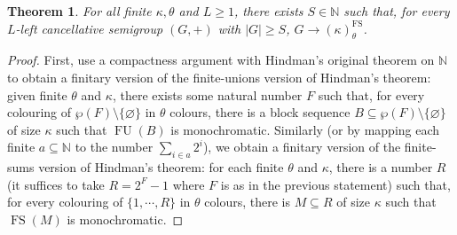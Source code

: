 \documentclass{amsart}
\newtheorem{theorem}{Theorem}[section]
\theoremstyle{definition}
\theoremstyle{remark}
\numberwithin{equation}{section}
\begin{document}
\begin{theorem}\label{fin-fin-hindman}
    For all finite $\kappa,\theta$ and $L\geq 1$, there exists $S\in\mathbb{N}$ such that, for every $L$-left cancellative semigroup $(G,+)$ with $|G|\geq S$, $G\to (\kappa)_{\theta}^{\operatorname{FS}}$.
\end{theorem}
\begin{proof}
    First, use a compactness argument with Hindman's original theorem on $\mathbb N$ to obtain a finitary version of the finite-unions version of Hindman's theorem: given finite $\theta$ and $\kappa$, there exists some natural number $F$ such that, for every colouring of $\wp(F)\setminus\{\varnothing\}$ in $\theta$ colours, there is a block sequence $B\subseteq\wp(F)\setminus\{\varnothing\}$ of size $\kappa$ such that $\operatorname{FU}(B)$ is monochromatic. Similarly (or by mapping each finite $a\subseteq\mathbb N$ to the number $\sum_{i\in a}2^i$), we obtain a finitary version of the finite-sums version of Hindman's theorem: for each finite $\theta$ and $\kappa$, there is a number $R$ (it suffices to take $R=2^{F}-1$ where $F$ is as in the previous statement) such that, for every colouring of $\{1,\cdots,R\}$ in $\theta$ colours, there is $M\subseteq R$ of size $\kappa$ such that $\operatorname{FS}(M)$ is monochromatic.
    

\end{proof}
\end{document}
